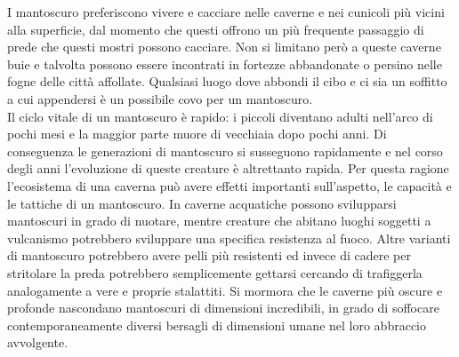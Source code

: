 \begin{multicols}{2}
I mantoscuro preferiscono vivere e cacciare nelle caverne e nei cunicoli più vicini alla superficie, dal momento che questi offrono un più frequente passaggio di prede che questi mostri possono cacciare. Non si limitano però a queste caverne buie e talvolta possono essere incontrati in fortezze abbandonate o persino nelle fogne delle città affollate. Qualsiasi luogo dove abbondi il cibo e ci sia un soffitto a cui appendersi è un possibile covo per un mantoscuro.\\

Il ciclo vitale di un mantoscuro è rapido: i piccoli diventano adulti nell’arco di pochi mesi e la maggior parte muore di vecchiaia dopo pochi anni. Di conseguenza le generazioni di mantoscuro si susseguono rapidamente e nel corso degli anni l’evoluzione di queste creature è altrettanto rapida. Per questa ragione l’ecosistema di una caverna può avere effetti importanti sull’aspetto, le capacità e le tattiche di un mantoscuro. In caverne acquatiche possono svilupparsi mantoscuri in grado di nuotare, mentre creature che abitano luoghi soggetti a vulcanismo potrebbero sviluppare una specifica resistenza al fuoco. Altre varianti di mantoscuro potrebbero avere pelli più resistenti ed invece di cadere per stritolare la preda potrebbero semplicemente gettarsi cercando di trafiggerla analogamente a vere e proprie stalattiti. Si mormora che le caverne più oscure e profonde nascondano mantoscuri di dimensioni incredibili, in grado di soffocare contemporaneamente diversi bersagli di dimensioni umane nel loro abbraccio avvolgente.\\


\end{multicols}
